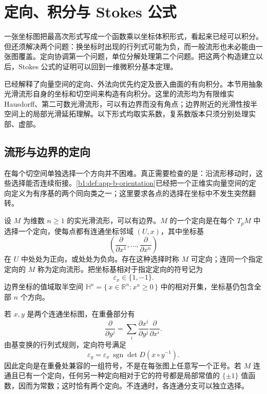 \section{定向、积分与 Stokes 公式}
\label{b1:sec:E104}

一张坐标图把最高次形式写成一个函数乘以坐标体积形式，看起来已经可以积分。但还须解决两个问题：换坐标时出现的行列式可能为负，而一般流形也未必能由一张图覆盖。定向协调第一个问题，单位分解处理第二个问题。把这两个构造建立以后，Stokes 公式的证明可以回到一维微积分基本定理。

\ProseParagraphBreak

已经解释了向量空间的定向、外法向优先约定及嵌入曲面的有向积分。本节用抽象光滑流形自身的坐标和切空间来构造有向积分。这里的流形均为有限维实 Hausdorff、第二可数光滑流形，可以有边界而没有角点；边界附近的光滑性按半空间上的局部光滑延拓理解。以下形式均取实系数，复系数版本只须分别处理实部、虚部。

\subsection{流形与边界的定向}
\label{b1:subsec:E10401}

在每个切空间单独选择一个方向并不困难。真正需要检查的是：沿流形移动时，这些选择能否连续衔接。\cref{b1:def:app-b-orientation}已经把一个正维实向量空间的定向定义为有序基的两个同向类之一；这里要求各点的选择在坐标中不发生突然翻转。

\begin{definition}\label{b1:def:E-orientation}
设 \(M\) 为维数 \(n\geq1\) 的实光滑流形，可以有边界。\(M\) 的一个定向是在每个 \(T_pM\) 中选择一个定向，使每点都有连通坐标邻域 \((U,x)\)，其中坐标基
\[
 \left(\frac{\partial}{\partial x^1},\ldots,
              \frac{\partial}{\partial x^n}\right)
\]
在 \(U\) 中处处为正向，或处处为负向。存在这种选择时称 \(M\) 可定向；连同一个指定定向的 \(M\) 称为定向流形。把坐标基相对于指定定向的符号记为
\[
 \varepsilon_x\in\{1,-1\}.
\]
边界坐标的值域取半空间
\(\mathbb H^n=\{\,x\in\mathbb R^n:x^n\geq0\,\}\)
中的相对开集，坐标基仍包含全部 \(n\) 个方向。
\end{definition}

若 \(x,y\) 是两个连通坐标图，在重叠部分有
\[
 \frac{\partial}{\partial y^j}
   =\sum_i\frac{\partial x^i}{\partial y^j}
                        \frac{\partial}{\partial x^i}.
\]
由基变换的行列式规则，定向符号满足
\begin{equation}\label{b1:eq:E-orientation-sign}
 \varepsilon_y
  =\varepsilon_x\,
     \operatorname{sgn}\det D(x\circ y^{-1}).
\end{equation}
因此定向是在重叠处兼容的一组符号，不是在每张图上任意写一个正号。若 \(M\) 连通且已有一个定向，任何另一种定向相对于它的符号都是局部常值的 \(\{\pm1\}\) 值函数，因而为常数；这时恰有两个定向。不连通时，各连通分支可以独立选择。

